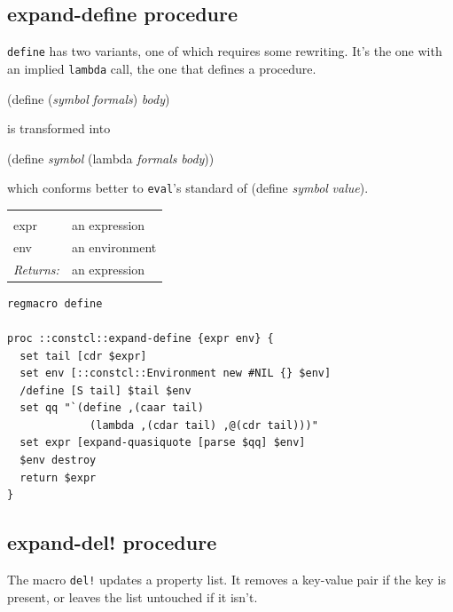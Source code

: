 \documentclass[twoside,9pt]{report}
\begin{document}
\subsection{expand-define procedure}
\label{expand-define-procedure}


\texttt{define} has two variants, one of which requires some rewriting. It's the one with an implied \texttt{lambda} call, the one that defines a procedure.


(define (\emph{symbol} \emph{formals}) \emph{body})


is transformed into


(define \emph{symbol} (lambda \emph{formals} \emph{body}))


which conforms better to \texttt{eval}'s standard of (define \emph{symbol} \emph{value}).

\noindent\begin{tabular}{ |p{1.5cm} p{8cm}| }
\hline
\rowcolor[HTML]{CCCCCC} \multicolumn{2}{|l|}{\bf expand-define (internal)} \\
expr & an expression \\
env & an environment \\
\textit{Returns:} & an expression \\
\hline
\end{tabular}
\begin{lstlisting}
regmacro define
 
proc ::constcl::expand-define {expr env} {
  set tail [cdr $expr]
  set env [::constcl::Environment new #NIL {} $env]
  /define [S tail] $tail $env
  set qq "`(define ,(caar tail)
             (lambda ,(cdar tail) ,@(cdr tail)))"
  set expr [expand-quasiquote [parse $qq] $env]
  $env destroy
  return $expr
}
\end{lstlisting}
\subsection{expand-del! procedure}
\label{expand-del"!-procedure}


The macro \texttt{del!} updates a property list. It removes a key-value pair if the key is present, or leaves the list untouched if it isn't.
\end{document}
